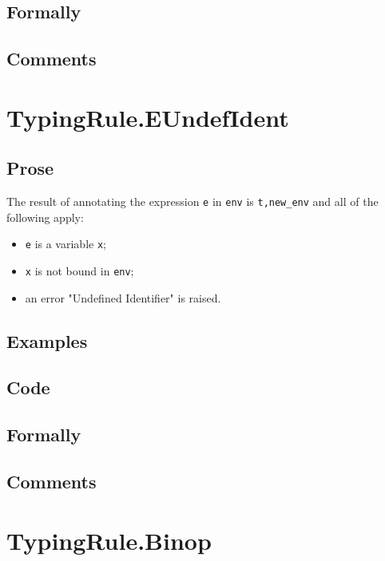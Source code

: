 \documentclass{book}
\begin{document}
  \subsection{Formally}

  \subsection{Comments}

\section{TypingRule.EUndefIdent \label{sec:TypingRule.EUndefIdent}}

  \subsection{Prose}
  The result of annotating the expression \texttt{e} in \texttt{env} is
\texttt{t,new\_env} and all of the following apply:
  \begin{itemize}
  \item \texttt{e} is a variable \texttt{x};
  \item \texttt{x} is not bound in \texttt{env};
  \item an error "Undefined Identifier" is raised.
  \end{itemize}

  \subsection{Examples}

  \subsection{Code}

  \subsection{Formally}

  \subsection{Comments}

\section{TypingRule.Binop \label{sec:TypingRule.Binop}}
\end{document}
